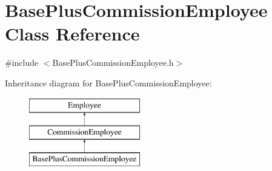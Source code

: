 \hypertarget{class_base_plus_commission_employee}{}\section{Base\+Plus\+Commission\+Employee Class Reference}
\label{class_base_plus_commission_employee}


{\ttfamily \#include $<$Base\+Plus\+Commission\+Employee.\+h$>$}

Inheritance diagram for Base\+Plus\+Commission\+Employee\+:\begin{figure}[H]
\begin{center}
\leavevmode
\includegraphics[height=3.000000cm]{class_base_plus_commission_employee}
\end{center}
\end{figure}
